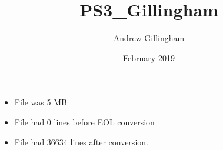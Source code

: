 \documentclass{article}
\title{PS3_Gillingham}
\author{Andrew Gillingham }
\date{February 2019}
\begin{document}
\maketitle
\begin{itemize}
    \item File was 5 MB
    \item File had 0 lines before EOL conversion
    \item File had 36634 lines after conversion. 
\end{itemize}
\end{document}
